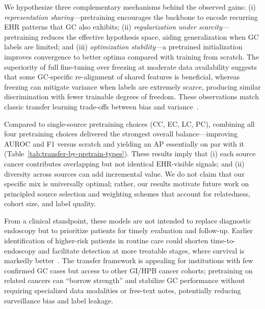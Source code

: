 \documentclass[diagnostics,article,submit,pdftex,moreauthors]{Definitions/mdpi}
\begin{document}
We hypothesize three complementary mechanisms behind the observed gains:
(i) \textit{representation sharing}—pretraining encourages the backbone to encode recurring EHR patterns that GC also exhibits;
(ii) \textit{regularization under scarcity}—pretraining reduces the effective hypothesis space, aiding generalization when GC labels are limited;
and (iii) \textit{optimization stability}—a pretrained initialization improves convergence to better optima compared with training from scratch. The superiority of full fine-tuning over freezing at moderate data availability suggests that some GC-specific re-alignment of shared features is beneficial, whereas freezing can mitigate variance when labels are extremely scarce, producing similar discrimination with fewer trainable degrees of freedom. These observations match classic transfer learning trade-offs between bias and variance~\citep{Pan2010_TLsurvey,Yosinski2014_transferable}.

Compared to single-source pretraining choices (CC, EC, LC, PC), combining all four pretraining choices delivered the strongest overall balance—improving AUROC and F1 versus scratch and yielding an AP essentially on par with it (Table~\ref{tab:transfer-by-pretrain-types}).
These results imply that (i) each source cancer contributes overlapping but not identical EHR-visible signals; and (ii) diversity across sources can add incremental value. We do not claim that our specific mix is universally optimal; rather, our results motivate future work on principled source selection and weighting schemes that account for relatedness, cohort size, and label quality.

From a clinical standpoint, these models are not intended to replace diagnostic endoscopy but to prioritize patients for timely evaluation and follow-up. Earlier identification of higher-risk patients in routine care could shorten time-to-endoscopy and facilitate detection at more treatable stages, where survival is markedly better~\citep{NCI2023stomach}. The transfer framework is appealing for institutions with few confirmed GC cases but access to other GI/HPB cancer cohorts; pretraining on related cancers can “borrow strength” and stabilize GC performance without requiring specialized data modalities or free-text notes, potentially reducing surveillance bias and label leakage.
\end{document}
